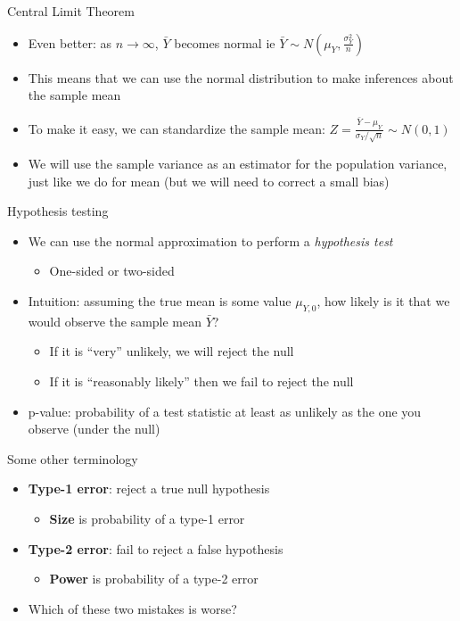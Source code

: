 \documentclass[aspectratio=169]{beamer}
\begin{document}
\begin{frame}{Central Limit Theorem}
    \begin{itemize}
        \item Even better: as $n \to \infty$, $\bar{Y}$ becomes normal ie $\bar{Y} \sim N(\mu_Y,\frac{\sigma_Y^2}{n})$
        \item This means that we can use the normal distribution to make inferences about the sample mean
        \item To make it easy, we can standardize the sample mean: $Z = \frac{\bar{Y} - \mu_Y}{\sigma_Y/\sqrt{n}} \sim N(0,1)$
        \item We will use the sample variance as an estimator for the population variance, just like we do for mean (but we will need to correct a small bias)
    \end{itemize}
\end{frame}

\begin{frame}{Hypothesis testing}
    \begin{itemize}
        \item We can use the normal approximation to perform a \textit{hypothesis test}
        \begin{itemize}
            \item One-sided or two-sided
        \end{itemize}
        \item Intuition: assuming the true mean is some value $\mu_{Y,0}$, how likely is it that we would observe the sample mean $\bar{Y}$?
        \begin{itemize}
            \item If it is ``very'' unlikely, we will reject the null
            \item If it is ``reasonably likely'' then we fail to reject the null
        \end{itemize}
        \item p-value: probability of a test statistic at least as unlikely as the one you observe (under the null)
    \end{itemize}
\end{frame}

\begin{frame}{Some other terminology}
    \begin{itemize}
        \item \textbf{Type-1 error}: reject a true null hypothesis
        \begin{itemize}
            \item \textbf{Size} is probability of a type-1 error
        \end{itemize}
        \item \textbf{Type-2 error}: fail to reject a false hypothesis
        \begin{itemize}
            \item \textbf{Power} is probability of a type-2 error
        \end{itemize}
        \item Which of these two mistakes is worse?
    \end{itemize}
\end{frame}
\end{document}
